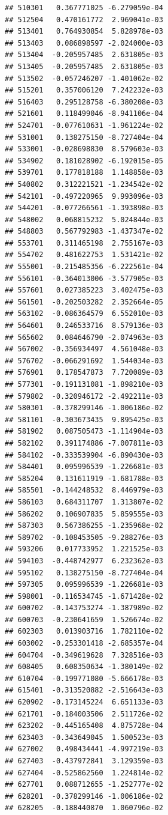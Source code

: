 \begin{frame}[fragile]
\begin{verbatim}
## 510301   0.367771025 -6.279059e-04
## 512504   0.470161772  2.969041e-03
## 513401   0.764930854  5.828978e-03
## 513403   0.086898597 -2.024000e-03
## 513404  -0.205957485  2.631805e-03
## 513405  -0.205957485  2.631805e-03
## 513502  -0.057246207 -1.401062e-02
## 515201   0.357006120  7.242232e-03
## 516403   0.295128758 -6.380208e-03
## 521601   0.118499046 -8.941106e-04
## 524701  -0.077610631 -1.961224e-02
## 531001   0.138275150 -8.727404e-04
## 533001  -0.028698830  8.579603e-03
## 534902   0.181028902 -6.192015e-05
## 539701   0.177818188  1.148858e-03
## 540802   0.312221521 -1.234542e-02
## 542101  -0.497220965  9.993096e-03
## 544201  -0.077266561 -1.393898e-03
## 548002   0.068815232  5.024844e-03
## 548803   0.567792983 -1.437347e-02
## 553701   0.311465198  2.755167e-03
## 554702   0.481622753  1.531421e-02
## 555001  -0.215485356 -6.222561e-04
## 556101  -0.364013006 -3.577905e-03
## 557601   0.027385223  3.402475e-03
## 561501  -0.202503282  2.352664e-05
## 563102  -0.086364579  6.552010e-03
## 564601   0.246533716  8.579136e-03
## 565602   0.084646790 -2.074963e-03
## 567002  -0.356934497  4.561048e-03
## 576702  -0.066291692  1.544034e-03
## 576901   0.178547873  7.720089e-03
## 577301  -0.191131081 -1.898210e-03
## 579802  -0.320946172 -2.492211e-03
## 580301  -0.378299146 -1.006186e-02
## 581101  -0.303673435  9.895425e-03
## 581902   0.087505473 -1.114904e-03
## 582102   0.391174886 -7.007811e-03
## 584102  -0.333539904 -6.890430e-03
## 584401   0.095996539 -1.226681e-03
## 585204   0.131611919 -1.681788e-03
## 585501  -0.144248532  8.446979e-03
## 586103   0.684311707  1.313807e-02
## 586202   0.106907835  5.859555e-03
## 587303   0.567386255 -1.235968e-02
## 589702  -0.108453505 -9.288276e-03
## 593206   0.017733952  1.221525e-03
## 594103  -0.448742977  6.232362e-03
## 595102   0.138275150 -8.727404e-04
## 597305   0.095996539 -1.226681e-03
## 598001  -0.116534745 -1.671428e-02
## 600702  -0.143753274 -1.387989e-02
## 600703  -0.230641659  1.526674e-02
## 602303   0.013903716  1.782110e-02
## 603002  -0.253301418 -2.685357e-04
## 604704  -0.349619628  7.328516e-03
## 608405   0.608350634 -1.380149e-02
## 610704  -0.199771080 -5.666178e-03
## 615401  -0.313520882 -2.516643e-03
## 620902  -0.173145224  6.651133e-03
## 621701  -0.184003506  2.511726e-02
## 623202  -0.445165408  4.875728e-04
## 623403  -0.343649045  1.500523e-03
## 627002   0.498434441 -4.997219e-03
## 627403  -0.437972841  3.129359e-03
## 627404  -0.525862560  1.224814e-02
## 627701   0.088712655 -1.252777e-02
## 628201  -0.378299146 -1.006186e-02
## 628205  -0.188440870  1.060796e-02

\end{verbatim}
\end{frame}
